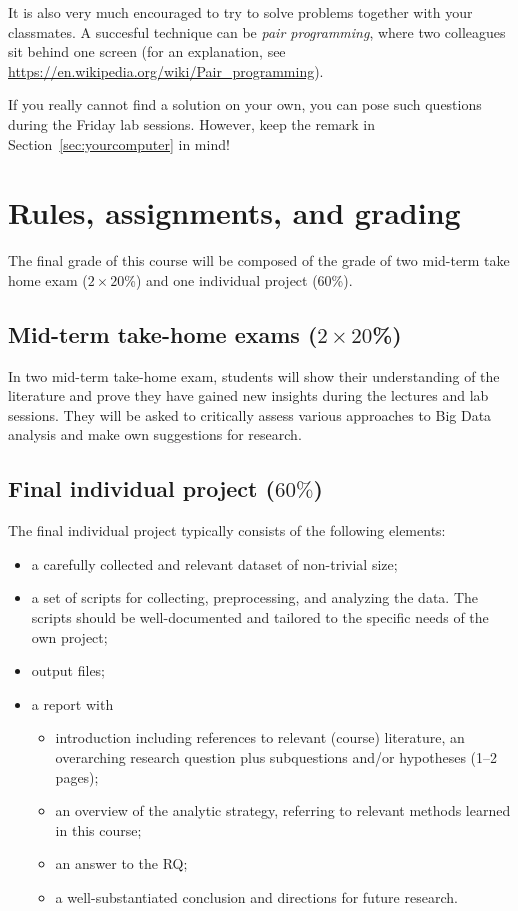 \documentclass[a4paper,10pt,twocolumn]{report}
\begin{document}
It is also very much encouraged to try to solve problems together with your classmates. A succesful technique can be \emph{pair programming}, where two colleagues sit behind one screen (for an explanation, see \url{https://en.wikipedia.org/wiki/Pair_programming}).

If you really cannot find a solution on your own, you can pose such questions during the Friday lab sessions. However, keep the remark in Section~\ref{sec:yourcomputer} in mind!


\chapter{Rules, assignments, and grading}
The final grade of this course will be composed of the grade of two mid-term take home exam ($2 \times 20$\%) and one individual project (60\%).

\section{Mid-term take-home exams ($2 \times 20$\%)}
In two mid-term take-home exam, students will show their understanding of the literature and prove they have gained new insights during the lectures and lab sessions. They will be asked to critically assess various approaches to Big Data analysis and make own suggestions for research.

\section{Final individual project ($60\%$)}
The final individual project typically consists of the following elements:
\begin{itemize}
\item a carefully collected and relevant dataset of non-trivial size;
\item a set of scripts for collecting, preprocessing, and analyzing the data. The scripts should be well-documented and tailored to the specific needs of the own project;
\item output files;
\item a report with
\begin{itemize}
	\item introduction including references to relevant (course) literature, an overarching research question plus subquestions and/or hypotheses (1--2 pages);
	\item an overview of the analytic strategy, referring to relevant methods learned in this course;
	\item an answer to the RQ;
	\item a well-substantiated conclusion and directions for future research.
\end{itemize}
\end{itemize}
\end{document}
